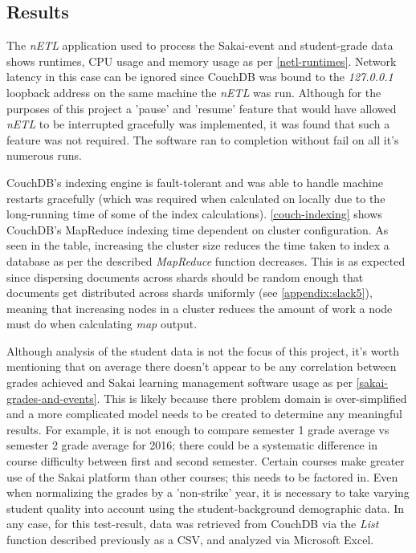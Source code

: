 \subsection{Results}
The \textit{nETL} application used to process the Sakai-event and student-grade data shows runtimes, CPU usage and memory usage as per \ref{netl-runtimes}. Network latency in this case can be ignored since CouchDB was bound to the \textit{127.0.0.1} loopback address on the same machine the \textit{nETL} was run. Although for the purposes of this project a 'pause' and 'resume' feature that would have allowed \textit{nETL} to be interrupted gracefully was implemented, it was found that such a feature was not required. The software ran to completion without fail on all it's numerous runs.

CouchDB's indexing engine is fault-tolerant and was able to handle machine restarts gracefully (which was required when calculated on locally due to the long-running time of some of the index calculations). \ref{couch-indexing} shows CouchDB's MapReduce indexing time dependent on cluster configuration. As seen in the table, increasing the cluster size reduces the time taken to index a database as per the described \textit{MapReduce} function decreases. This is as expected since dispersing documents across shards should be random enough that documents get distributed across shards uniformly (see \ref{appendix:slack5}), meaning that increasing nodes in a cluster reduces the amount of work a node must do when calculating \textit{map} output.

Although analysis of the student data is not the focus of this project, it's worth mentioning that on average there doesn't appear to be any correlation between grades achieved and Sakai learning management software usage as per \ref{sakai-grades-and-events}. This is likely because there problem domain is over-simplified and a more complicated model needs to be created to determine any meaningful results. For example, it is not enough to compare semester 1 grade average vs semester 2 grade average for 2016; there could be a systematic difference in course difficulty between first and second semester. Certain courses make greater use of the Sakai platform than other courses; this needs to be factored in. Even when normalizing the grades by a 'non-strike' year, it is necessary to take varying student quality into account using the student-background demographic data. In any case, for this test-result, data was retrieved from CouchDB via the \textit{List} function described previously as a CSV, and analyzed via Microsoft Excel.

